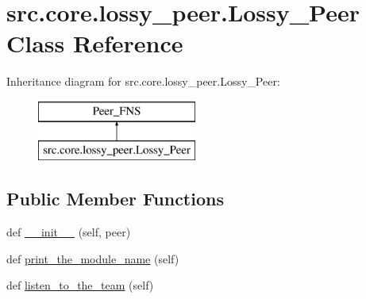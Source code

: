 \hypertarget{classsrc_1_1core_1_1lossy__peer_1_1Lossy__Peer}{}\section{src.\+core.\+lossy\+\_\+peer.\+Lossy\+\_\+\+Peer Class Reference}
\label{classsrc_1_1core_1_1lossy__peer_1_1Lossy__Peer}
Inheritance diagram for src.\+core.\+lossy\+\_\+peer.\+Lossy\+\_\+\+Peer\+:\begin{figure}[H]
\begin{center}
\leavevmode
\includegraphics[height=2.000000cm]{classsrc_1_1core_1_1lossy__peer_1_1Lossy__Peer}
\end{center}
\end{figure}
\subsection*{Public Member Functions}
\begin{DoxyCompactItemize}
\item 
def \hyperlink{classsrc_1_1core_1_1lossy__peer_1_1Lossy__Peer_a3adafb293fe4d7a80955a1ee979d1ac7}{\+\_\+\+\_\+init\+\_\+\+\_\+} (self, peer)
\item 
def \hyperlink{classsrc_1_1core_1_1lossy__peer_1_1Lossy__Peer_a5ef4bd917a7e5bdcad32d44523d5345c}{print\+\_\+the\+\_\+module\+\_\+name} (self)
\item 
def \hyperlink{classsrc_1_1core_1_1lossy__peer_1_1Lossy__Peer_af4ad19b423b0dea844a2cbe6d211f0d4}{listen\+\_\+to\+\_\+the\+\_\+team} (self)
\end{DoxyCompactItemize}
